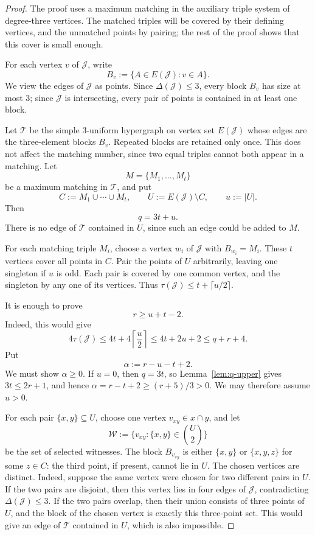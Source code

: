 \documentclass[11pt]{amsart}
\theoremstyle{remark}
\newcommand{\cJ}{\mathcal J}
\newcommand{\cT}{\mathcal T}
\newcommand{\ta}{\tau}
\newcommand{\Del}{\Delta}
\begin{document}
\begin{proof}
The proof uses a maximum matching in the auxiliary triple system of
degree-three vertices.  The matched triples will be covered by their defining
vertices, and the unmatched points by pairing; the rest of the proof shows
that this cover is small enough.

For each vertex $v$ of $\cJ$, write
\[
  B_v:=\{A\in E(\cJ):v\in A\}.
\]
We view the edges of $\cJ$ as points.  Since $\Del(\cJ)\le 3$, every block
$B_v$ has size at most $3$; since $\cJ$ is intersecting, every pair of points
is contained in at least one block.

Let $\cT$ be the simple $3$-uniform hypergraph on vertex set $E(\cJ)$ whose
edges are the three-element blocks $B_v$.  Repeated blocks are retained only
once.  This does not affect the matching number, since two equal triples
cannot both appear in a matching.  Let
\[
  M=\{M_1,\ldots,M_t\}
\]
be a maximum matching in $\cT$, and put
\[
  C:=M_1\cup\cdots\cup M_t,\qquad U:=E(\cJ)\setminus C,\qquad u:=|U|.
\]
Then
\begin{equation}\label{eq:q-tu}
  q=3t+u.
\end{equation}
There is no edge of $\cT$ contained in $U$, since such an edge could be added
to $M$.

For each matching triple $M_i$, choose a vertex $w_i$ of $\cJ$ with
$B_{w_i}=M_i$.  These $t$ vertices cover all points in $C$.  Pair the points
of $U$ arbitrarily, leaving one singleton if $u$ is odd.  Each pair is covered
by one common vertex, and the singleton by any one of its vertices.  Thus
$\ta(\cJ)\le t+\lceil u/2\rceil$.

It is enough to prove
\begin{equation}\label{eq:alpha-target}
  r\ge u+t-2.
\end{equation}
Indeed, this would give
\[
  4\ta(\cJ)\le 4t+4\left\lceil\frac u2\right\rceil
  \le 4t+2u+2\le q+r+4.
\]
Put
\[
  \alpha:=r-u-t+2.
\]
We must show $\alpha\ge 0$.  If $u=0$, then $q=3t$, so
Lemma~\ref{lem:q-upper} gives $3t\le 2r+1$, and hence
$\alpha=r-t+2\ge (r+5)/3>0$.  We may therefore assume $u>0$.

For each pair $\{x,y\}\subseteq U$, choose one vertex
$v_{xy}\in x\cap y$, and let
\[
  \mathcal W:=\{v_{xy}:\{x,y\}\in \binom U2\}
\]
be the set of selected witnesses.  The block $B_{v_{xy}}$ is either $\{x,y\}$ or
$\{x,y,z\}$ for some $z\in C$: the third point, if present, cannot lie in
$U$.  The chosen vertices are distinct.  Indeed, suppose the same vertex
were chosen for two different pairs in $U$.  If the two pairs are disjoint,
then this vertex lies in four edges of $\cJ$, contradicting
$\Del(\cJ)\le 3$.  If the two pairs overlap, then their union consists of
three points of $U$, and the block of the chosen vertex is exactly this
three-point set.  This would give an edge of $\cT$ contained in $U$, which is
also impossible.


\end{proof}
\end{document}
